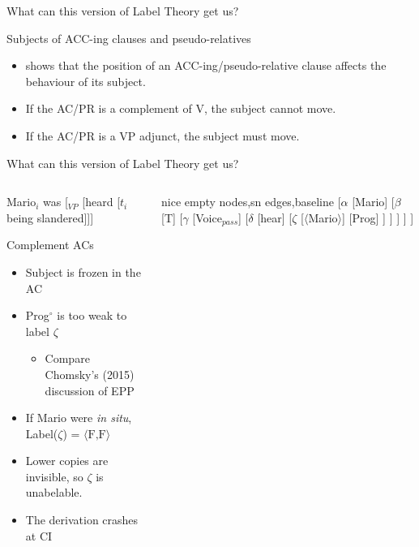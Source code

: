 \documentclass[proposal]{subfiles}
\begin{document}
\begin{frame}
  {What can this version of Label Theory get us?}
  \begin{block}
    {Subjects of ACC-ing clauses and pseudo-relatives}
    \begin{itemize}
      \item<2-> \textcite{cinque1996pseudo} shows that the position of an ACC-ing/pseudo-relative clause affects the behaviour of its subject.
    \end{itemize}
    \begin{itemize}
      \item<3-> If the AC/PR is a complement of V, the subject cannot move.
      \item<3-> If the AC/PR is a VP adjunct, the subject must move.
    \end{itemize}
  \end{block}
\end{frame}
\begin{frame}
  {What can this version of Label Theory get us?}

    \begin{columns}
    \begin{column}[T]{0.6\textwidth}
      {\rm *Mario$_i$ was [$_{VP}$ [heard [$t_i$ being slandered]]]}
      \begin{block}
	{Complement ACs}
	\begin{itemize}
	  \item Subject is frozen in the AC
	  \item Prog$^\circ$ is too weak to label $\zeta$
	    \begin{itemize}
	      \item Compare Chomsky's (2015) discussion of EPP
	    \end{itemize}
	  \item If {\rm Mario} were \textit{in situ}, Label($\zeta$) = $\langle\text{F,F}\rangle$
	  \item Lower copies are invisible, so $\zeta$ is unabelable.
	  \item The derivation crashes at CI
	\end{itemize}
      \end{block}
    \end{column}
    \begin{column}[T]{0.4\textwidth}
	{\small
	  \begin{forest}
	    nice empty nodes,sn edges,baseline
	    [$\alpha$
	      [{\rm Mario}]
	      [$\beta$
		[T]
		[$\gamma$
		  [Voice$_{pass}$]
		  [$\delta$
		    [{\rm hear}]
		    [$\zeta$
		      [$\langle${\rm Mario}$\rangle$]
		      [Prog]
		    ]
		  ]
		]
	      ]
	    ]
	  \end{forest}
	}
    \end{column}
  \end{columns}
\end{frame}
\end{document}
